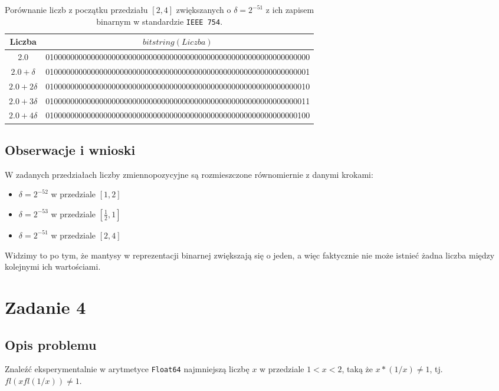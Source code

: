 \documentclass{article}
\begin{document}
\begin{table}[H]
\begin{adjustbox}{center}
\begin{tabular}{|c|c|}
    \hline
    Liczba & $bitstring(Liczba)$\\
    \hline
    2.0 & 0100000000000000000000000000000000000000000000000000000000000000\\
    \hline
    $2.0 + \delta$ & 0100000000000000000000000000000000000000000000000000000000000001\\
    \hline
    $2.0 + 2\delta$ & 0100000000000000000000000000000000000000000000000000000000000010\\
    \hline
    $2.0 + 3\delta$ & 0100000000000000000000000000000000000000000000000000000000000011\\
    \hline
    $2.0 + 4\delta$ & 0100000000000000000000000000000000000000000000000000000000000100\\
    \hline
\end{tabular}
\end{adjustbox}
\caption{Porównanie liczb z początku przedziału $[2, 4]$ zwiększanych o $\delta = 2^{-51}$ z ich zapisem binarnym w standardzie \texttt{IEEE 754}.}
\end{table}

\subsection{Obserwacje i wnioski}
W zadanych przedziałach liczby zmiennopozycyjne są rozmieszczone równomiernie z danymi krokami:
\begin{itemize}
    \item $\delta = 2^{-52}$ w przedziale $[1, 2]$
    \item $\delta = 2^{-53}$ w przedziale $[\frac{1}{2}, 1]$
    \item $\delta = 2^{-51}$ w przedziale $[2, 4]$
\end{itemize}
Widzimy to po tym, że mantysy w reprezentacji binarnej zwiększają się o jeden, a więc faktycznie nie może istnieć żadna
liczba między kolejnymi ich wartościami.

\section{Zadanie 4}
\subsection{Opis problemu}
Znaleźć eksperymentalnie w arytmetyce \texttt{Float64} najmniejszą liczbę $x$ w przedziale $1 < x < 2$, taką że
$x * (1/x) \neq 1$, tj. $fl(xfl(1/x)) \neq 1$.
\end{document}
